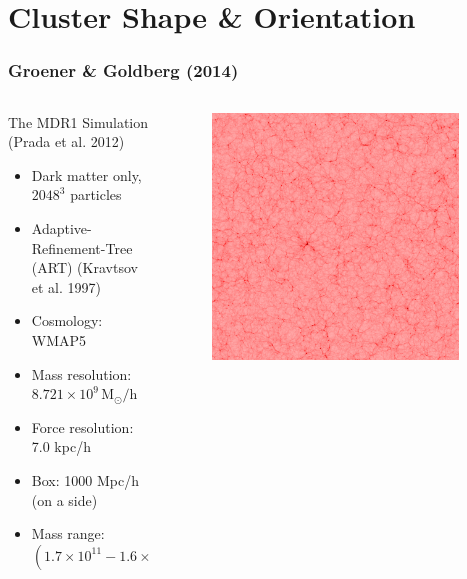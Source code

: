 \documentclass[hyperref={pdfpagelabels=false}]{beamer}
\begin{document}
\section{Cluster Shape \& Orientation} 
\begin{frame}
\frametitle{Groener \& Goldberg (2014)}
  \begin{columns}
    \centering
    \begin{column}{0.5\textwidth}
      \begin{block}{The MDR1 Simulation {\tiny (Prada et al. 2012)}}
        \begin{itemize}
        \item Dark matter only, $2048^{3}$ particles
        \item Adaptive-Refinement-Tree (ART) {\tiny (Kravtsov et al. 1997)}
        \item Cosmology: WMAP5
        \item Mass resolution: $\mathrm{8.721 \times 10^{9} \, M_{\odot}/h}$
        \item Force resolution: 7.0 kpc/h
        \item Box: 1000 Mpc/h (on a side)
        \item Mass range: $\mathrm{(1.7 \times 10^{11} - 1.6 \times 10^{15}) \,
            M_{\odot}/h}$
        \end{itemize}
      \end{block}
    \end{column}
    \begin{column}{0.5\textwidth}
      \begin{figure}
        \includegraphics[width=0.95\textwidth]{multidarksim.png}
      \end{figure}
    \end{column}
  \end{columns}
\end{frame}
\end{document}
